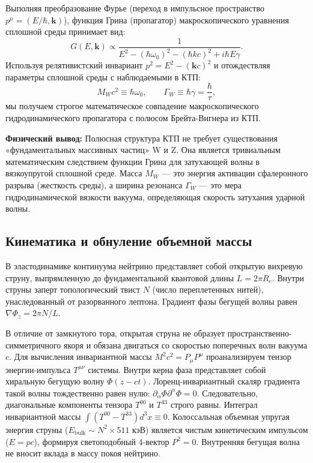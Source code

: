 \documentclass[11pt,a4paper]{article}
\begin{document}
Выполняя преобразование Фурье (переход в импульсное пространство $p^\mu = (E/\hbar, \mathbf{k})$), функция Грина (пропагатор) макроскопического уравнения сплошной среды принимает вид:
\begin{equation}
G(E, \mathbf{k}) \propto \frac{1}{E^2 - (\hbar\omega_0)^2 - (\hbar k c)^2 + i \hbar E \gamma}.
\end{equation}
Используя релятивистский инвариант $p^2 = E^2 - (\mathbf{k}c)^2$ и отождествляя параметры сплошной среды с наблюдаемыми в КТП:
\begin{equation}
M_W c^2 \equiv \hbar \omega_0, \qquad \Gamma_W \equiv \hbar \gamma = \frac{\hbar}{\tau},
\end{equation}
мы получаем строгое математическое совпадение макроскопического гидродинамического пропагатора с полюсом Брейта-Вигнера из КТП. 

\textbf{Физический вывод:} Полюсная структура КТП не требует существования «фундаментальных массивных частиц» W и Z. Она является тривиальным математическим следствием функции Грина для затухающей волны в вязкоупругой сплошной среде. Масса $M_W$ — это энергия активации сфалеронного разрыва (жесткость среды), а ширина резонанса $\Gamma_W$ — это мера гидродинамической вязкости вакуума, определяющая скорость затухания ударной волны. 

\subsection{Кинематика и обнуление объемной массы}
В эластодинамике континуума нейтрино представляет собой открытую вихревую струну, выпрямленную до фундаментальной квантовой длины $L = 2\pi R_e$. Внутри струны заперт топологический твист $N$ (число переплетенных нитей), унаследованный от разорванного лептона. Градиент фазы бегущей волны равен $\nabla \Phi_z = 2\pi N / L$.

В отличие от замкнутого тора, открытая струна не образует пространственно-симметричного якоря и обязана двигаться со скоростью поперечных волн вакуума $c$. Для вычисления инвариантной массы $M^2 c^2 = P_\mu P^\mu$ проанализируем тензор энергии-импульса $T^{\mu\nu}$ системы.
Внутри керна фаза представляет собой хиральную бегущую волну $\Phi(z-ct)$. Лоренц-инвариантный скаляр градиента такой волны тождественно равен нулю: $\partial_\alpha \Phi \partial^\alpha \Phi = 0$. 
Следовательно, диагональные компоненты тензора $T^{00}$ и $T^{33}$ строго равны. Интеграл инвариантной массы $\int (T^{00} - T^{33}) d^3x \equiv 0$. Колоссальная объемная упругая энергия струны ($E_{\text{bulk}} \sim N^2 \times 511$ кэВ) является чистым кинетическим импульсом ($E = pc$), формируя светоподобный 4-вектор $P^2 = 0$. Внутренняя бегущая волна не вносит вклада в массу покоя нейтрино.
\end{document}
